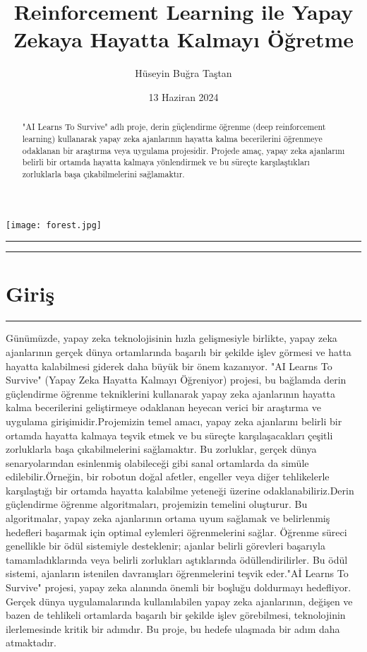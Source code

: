 \documentclass{article}
\title{Reinforcement Learning ile Yapay Zekaya Hayatta Kalmayı Öğretme}
\author{Hüseyin Buğra Taştan}
\date{13 Haziran 2024}
\begin{document}
    \maketitle
    \begin{center}
        \texttt{[image: forest.jpg]} 
    \end{center}
    \vfill
    \rule{\textwidth}{0.5pt}
    \renewcommand{\abstractname}{Özet}
\begin{abstract}
\noindent "AI Learns To Survive" adlı proje, derin güçlendirme öğrenme (deep reinforcement learning) kullanarak yapay zeka ajanlarının hayatta kalma becerilerini öğrenmeye odaklanan bir araştırma veya uygulama projesidir. Projede amaç, yapay zeka ajanlarını belirli bir ortamda hayatta kalmaya yönlendirmek ve bu süreçte karşılaştıkları zorluklarla başa çıkabilmelerini sağlamaktır.
\end{abstract}
\rule{\textwidth}{0.5pt}
    \vfill

\newpage
\section{Giriş}
\rule{\textwidth}{0.5pt}
Günümüzde, yapay zeka teknolojisinin hızla gelişmesiyle birlikte, yapay zeka ajanlarının gerçek dünya ortamlarında başarılı bir şekilde işlev görmesi ve hatta hayatta kalabilmesi giderek daha büyük bir önem kazanıyor. "AI Learns To Survive" (Yapay Zeka Hayatta Kalmayı Öğreniyor) projesi, bu bağlamda derin güçlendirme öğrenme tekniklerini kullanarak yapay zeka ajanlarının hayatta kalma becerilerini geliştirmeye odaklanan heyecan verici bir araştırma ve uygulama girişimidir.Projemizin temel amacı, yapay zeka ajanlarını belirli bir ortamda hayatta kalmaya teşvik etmek ve bu süreçte karşılaşacakları çeşitli zorluklarla başa çıkabilmelerini sağlamaktır. Bu zorluklar, gerçek dünya senaryolarından esinlenmiş olabileceği gibi sanal ortamlarda da simüle edilebilir.Örneğin, bir robotun doğal afetler, engeller veya diğer tehlikelerle karşılaştığı bir ortamda hayatta kalabilme yeteneği üzerine odaklanabiliriz.Derin güçlendirme öğrenme algoritmaları, projemizin temelini oluşturur. Bu algoritmalar, yapay zeka ajanlarının ortama uyum sağlamak ve belirlenmiş hedefleri başarmak için optimal eylemleri öğrenmelerini sağlar. Öğrenme süreci genellikle bir ödül sistemiyle desteklenir; ajanlar belirli görevleri başarıyla tamamladıklarında veya belirli zorlukları aştıklarında ödüllendirilirler. Bu ödül sistemi, ajanların istenilen davranışları öğrenmelerini teşvik eder."Aİ Learns To Survive" projesi, yapay zeka alanında önemli bir boşluğu doldurmayı hedefliyor. Gerçek dünya uygulamalarında kullanılabilen yapay zeka ajanlarının, değişen ve bazen de tehlikeli ortamlarda başarılı bir şekilde işlev görebilmesi, teknolojinin ilerlemesinde kritik bir adımdır. Bu proje, bu hedefe ulaşmada bir adım daha atmaktadır.
  \newpage
\end{document}
